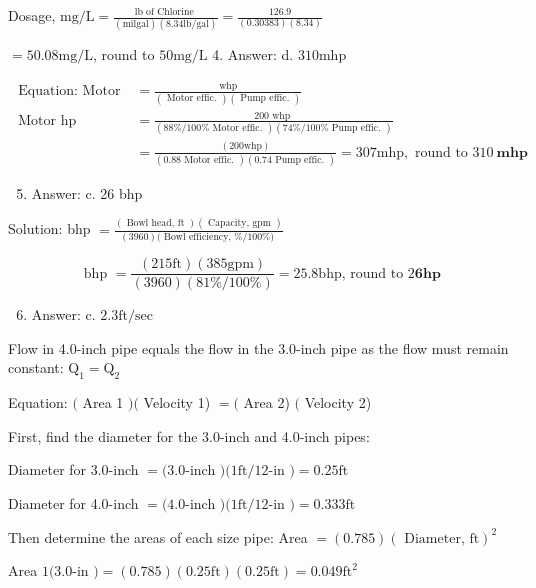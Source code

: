 \documentclass[10pt]{article}
\begin{document}
Dosage, $\mathrm{mg} / \mathrm{L}=\frac{\mathrm{lb} \text { of Chlorine }}{(\mathrm{mil} \mathrm{gal})(8.34 \mathrm{lb} / \mathrm{gal})}=\frac{126.9}{(0.30383)(8.34)}$

$=50.08 \mathrm{mg} / \mathrm{L}$, round to $50 \mathrm{mg} / \mathrm{L}$ 4. Answer: d. $310 \mathrm{mhp}$

$$
\begin{aligned}
\text { Equation: Motor hp } &=\frac{\text { whp }}{(\text { Motor effic. })(\text { Pump effic. })} \\
\text { Motor hp } &=\frac{200 \text { whp }}{(88 \% / 100 \% \text { Motor effic. })(74 \% / 100 \% \text { Pump effic. })} \\
&=\frac{(200 \mathrm{whp})}{(0.88 \text { Motor effic. })(0.74 \text { Pump effic. })}=307 \mathrm{mhp}, \text { round to } 310 \mathbf{~ m h p}
\end{aligned}
$$

\begin{enumerate}
  \setcounter{enumi}{4}
  \item Answer: c. 26 bhp
\end{enumerate}

Solution: bhp $=\frac{(\text { Bowl head, ft })(\text { Capacity, gpm })}{(3960)(\text { Bowl efficiency, \%/100\%) }}$

$$
\text { bhp }=\frac{(215 \mathrm{ft})(385 \mathrm{gpm})}{(3960)(81 \% / 100 \%)}=25.8 \mathrm{bhp} \text {, round to } 2 \mathbf{6 h p}
$$

\begin{enumerate}
  \setcounter{enumi}{5}
  \item Answer: c. $2.3 \mathrm{ft} / \mathrm{sec}$
\end{enumerate}

Flow in 4.0-inch pipe equals the flow in the 3.0-inch pipe as the flow must remain constant: $\mathrm{Q}_{1}=\mathrm{Q}_{2}$

Equation: $($ Area 1 $)($ Velocity 1) $=($ Area 2) $($ Velocity 2)

First, find the diameter for the 3.0-inch and 4.0-inch pipes:

Diameter for 3.0-inch $=(3.0$-inch $)(1 \mathrm{ft} / 12$-in $)=0.25 \mathrm{ft}$

Diameter for 4.0-inch $=(4.0$-inch $)(1 \mathrm{ft} / 12$-in $)=0.333 \mathrm{ft}$

Then determine the areas of each size pipe: Area $=(0.785)(\text { Diameter, } \mathrm{ft})^{2}$

Area $1(3.0$-in $)=(0.785)(0.25 \mathrm{ft})(0.25 \mathrm{ft})=0.049 \mathrm{ft}^{2}$
\end{document}

